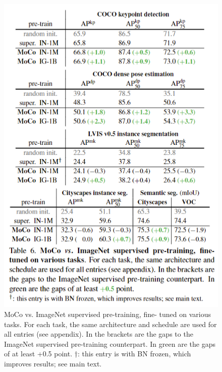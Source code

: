 \documentclass[10pt,twocolumn]{article}  %
\begin{document}
\begin{figure}[htbp]
    \centering
    \includegraphics[width=0.8\linewidth]{Pic/table6.png} %
    \caption{MoCo vs. ImageNet supervised pre-training, ﬁne-
    tuned on various tasks. For each task, the same architecture and
    schedule are used for all entries (see appendix). In the brackets are
    the gaps to the ImageNet supervised pre-training counterpart. In
    green are the gaps of at least +0.5 point.
    †: this entry is with BN frozen, which improves results; see main text.} %
    \label{fig:Table 6} %
\end{figure}
\end{document}
